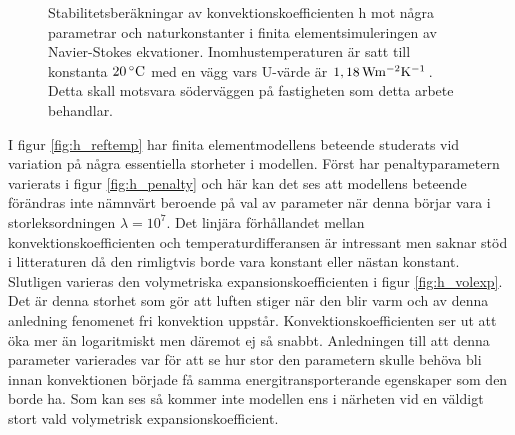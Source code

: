 \begin{figure}[hpbt]

\caption{\label{fig:konv_param}Stabilitetsberäkningar av konvektionskoefficienten h mot några
parametrar och naturkonstanter i finita elementsimuleringen av Navier-Stokes ekvationer.
Inomhustemperaturen är satt till konstanta $\unit[20]{^\circ C}$ med en vägg vars U-värde är
$\unit[1,18]{ Wm^{-2}K^{-1}}$. Detta skall motsvara söderväggen på fastigheten som detta arbete behandlar.}

\end{figure}

I figur \ref{fig:h_reftemp} har finita elementmodellens beteende studerats vid variation på några essentiella storheter i modellen.
Först har penaltyparametern varierats i figur \ref{fig:h_penalty} och här kan det ses att modellens beteende förändras inte nämnvärt
beroende på val av parameter när denna börjar vara i storleksordningen $\lambda = 10^7$. Det linjära förhållandet mellan
konvektionskoefficienten och temperaturdifferansen är intressant men saknar stöd i litteraturen då den rimligtvis borde vara
konstant eller nästan konstant. Slutligen varieras den volymetriska expansionskoefficienten
i figur \ref{fig:h_volexp}. Det är denna storhet
som gör att luften stiger när den blir varm och av denna anledning fenomenet fri konvektion uppstår. Konvektionskoefficienten
ser ut att öka mer än logaritmiskt men däremot ej så snabbt. Anledningen till att denna parameter varierades var för
att se hur stor den parametern skulle behöva bli innan konvektionen började få samma energitransporterande egenskaper
som den borde ha. Som kan ses så kommer inte modellen ens i närheten vid en väldigt stort vald volymetrisk expansionskoefficient.


